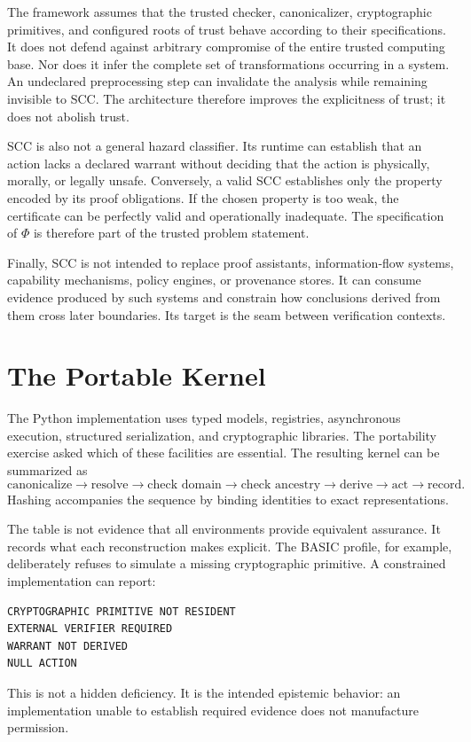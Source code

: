 \documentclass[11pt]{article}
\begin{document}
The framework assumes that the trusted checker, canonicalizer, cryptographic primitives, and configured roots of trust behave according to their specifications. It does not defend against arbitrary compromise of the entire trusted computing base. Nor does it infer the complete set of transformations occurring in a system. An undeclared preprocessing step can invalidate the analysis while remaining invisible to SCC. The architecture therefore improves the explicitness of trust; it does not abolish trust.

SCC is also not a general hazard classifier. Its runtime can establish that an action lacks a declared warrant without deciding that the action is physically, morally, or legally unsafe. Conversely, a valid SCC establishes only the property encoded by its proof obligations. If the chosen property is too weak, the certificate can be perfectly valid and operationally inadequate. The specification of $\Phi$ is therefore part of the trusted problem statement.

Finally, SCC is not intended to replace proof assistants, information-flow systems, capability mechanisms, policy engines, or provenance stores. It can consume evidence produced by such systems and constrain how conclusions derived from them cross later boundaries. Its target is the seam between verification contexts.

\section{The Portable Kernel}
The Python implementation uses typed models, registries, asynchronous execution, structured serialization, and cryptographic libraries. The portability exercise asked which of these facilities are essential. The resulting kernel can be summarized as
\[
\boxed{\text{canonicalize}\to\text{resolve}\to\text{check domain}\to\text{check ancestry}\to\text{derive}\to\text{act}\to\text{record}.}
\]
Hashing accompanies the sequence by binding identities to exact representations.



The table is not evidence that all environments provide equivalent assurance. It records what each reconstruction makes explicit. The BASIC profile, for example, deliberately refuses to simulate a missing cryptographic primitive. A constrained implementation can report:
\begin{verbatim}
CRYPTOGRAPHIC PRIMITIVE NOT RESIDENT
EXTERNAL VERIFIER REQUIRED
WARRANT NOT DERIVED
NULL ACTION
\end{verbatim}
This is not a hidden deficiency. It is the intended epistemic behavior: an implementation unable to establish required evidence does not manufacture permission.
\end{document}
